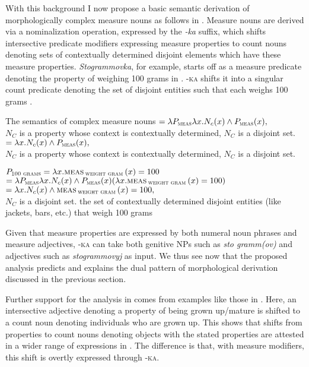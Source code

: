 \documentclass[output=paper]{langscibook}
\begin{document}
\noindent With this background I now propose a basic semantic derivation of morphologically complex measure nouns as follows in . Measure nouns are derived via a nominalization operation, expressed by the \textit{-ka} suffix, which shifts intersective predicate modifiers expressing measure properties to count nouns denoting sets of contextually determined disjoint elements which have these measure properties. \textit{Stogrammovka}, for example, starts off as a measure predicate denoting the property of weighing 100 grams in . \textsc{-ka} shifts it into a singular count predicate denoting the set of disjoint entities such that each weighs 100 grams .

\ea\label{ex:khrizmann:17} The semantics of complex measure nouns
    \ea\label{ex:khrizmann:17a}  $= \lambda P_{\textsc{meas}} \lambda x.N_{c}(x) \wedge P_{\textsc{meas}}(x),$\\
    {\small $N_C$ is a property whose context is contextually determined, $N_C$ is a disjoint set.}
    \ex\label{ex:khrizmann:17b}  $= \lambda x. N_{c}(x) \wedge P_{\textsc{meas}}(x),$\\
    {\small $N_C$ is a property whose context is contextually determined, $N_C$ is a disjoint set.}
\z\z

\ea\label{ex:khrizmann:18}
    \ea\label{ex:khrizmann:18a} $P_{\textsc{100 grams}} = \lambda x. \textsc{meas}\,_{\textsc{weight gram}}\,(x) = 100$
    \ex\label{ex:khrizmann:18b}  $= \lambda P_{\textsc{meas}} \lambda x.N_{c}(x) \wedge P_{\textsc{meas}}(x) (\lambda x.\textsc{meas}\,_{\textsc{weight gram}}\,(x) = 100)$\\
            $= \lambda x.N_{c}(x) \wedge \textsc{meas}\,_{\textsc{weight gram}}\,(x) = 100,$\\
            \hspace{.7em} {\small $N_C$ is a disjoint set.}
    \z
    {\small the set of contextually determined disjoint entities (like jackets, bars, etc.) that weigh 100 grams}
\z

\noindent Given that measure properties are expressed by both numeral noun phrases and measure adjectives, \textsc{-ka} can take both genitive NPs such as \textit{sto gramm(ov)} and adjectives such as \textit{stogrammovyj} as input. We thus see now that the proposed analysis predicts and explains the dual pattern of morphological derivation discussed in the previous section.

Further support for the analysis in  comes from examples like those in . Here, an intersective adjective denoting a property of being grown up/\hspace{0pt}mature is shifted to a count noun denoting individuals who are grown up. This shows that shifts from properties to count nouns denoting objects with the stated properties are attested in a wider range of expressions in . The difference is that, with measure modifiers, this shift is overtly expressed through \textsc{-ka}.
\end{document}
